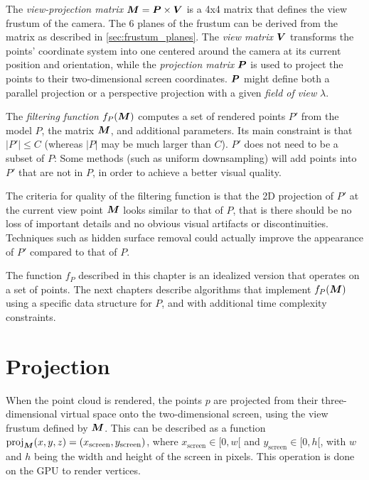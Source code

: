 \documentclass[a4paper,10pt,abstracton,notitlepage]{scrreprt}
\begin{document}
The \emph{view-projection matrix} $\matrixsym{M} = \matrixsym{P} \times \matrixsym{V}$ is a 4x4 matrix that defines the view frustum of the camera. The 6 planes of the frustum can be derived from the matrix as described in \ref{sec:frustum_planes}. The \emph{view matrix} $\matrixsym{V}$ transforms the points' coordinate system into one centered around the camera at its current position and orientation, while the \emph{projection matrix} $\matrixsym{P}$ is used to project the points to their two-dimensional screen coordinates. $\matrixsym{P}$ might define both a parallel projection or a perspective projection with a given \emph{field of view} $\lambda$.

The \emph{filtering function} $f_{P}(\matrixsym{M})$ computes a set of rendered points $P'$ from the model $P$, the matrix $\matrixsym{M}$, and additional parameters. Its main constraint is that $|P'| \leq C$ (whereas $|P|$ may be much larger than $C$). $P'$ does not need to be a subset of $P$: Some methods (such as uniform downsampling) will add points into $P'$ that are not in $P$, in order to achieve a better visual quality.

The criteria for quality of the filtering function is that the 2D projection of $P'$ at the current view point $\matrixsym{M}$ looks similar to that of $P$, that is there should be no loss of important details and no obvious visual artifacts or discontinuities. Techniques such as hidden surface removal could actually improve the appearance of $P'$ compared to that of $P$.

The function $f_{P}$ described in this chapter is an idealized version that operates on a set of points. The next chapters describe algorithms that implement $f_{P}(\matrixsym{M})$ using a specific data structure for $P$, and with additional time complexity constraints.


\section{Projection}
When the point cloud is rendered, the points $p$ are projected from their three-dimensional virtual space onto the two-dimensional screen, using the view frustum defined by $\matrixsym{M}$. This can be described as a function $\mathrm{proj}_{\matrixsym{M}}(x, y, z) = (x_{\mathrm{screen}}, y_{\mathrm{screen}})$, where $x_{\mathrm{screen}} \in [0, w[$ and $y_{\mathrm{screen}} \in [0, h[$, with $w$ and $h$ being the width and height of the screen in pixels. This operation is done on the GPU to render vertices.
\end{document}
